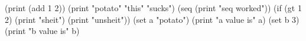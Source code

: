 (print (add 1 2))
(print "potato" "this" "sucks")
(seq (print "seq worked"))
(if (gt 1 2) (print "sheit") (print "unsheit"))
(set a "potato")
(print "a value is" a)
(set b 3)
(print "b value is" b)
